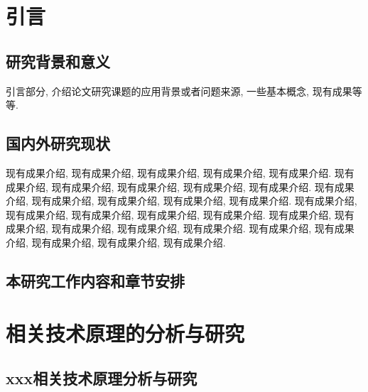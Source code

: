 \documentclass[UTF8,openright]{ctexbook}
\begin{document}
\newpage%
\pagestyle{fancy}

\listoffigures %


\newpage%
\pagestyle{fancy}
\fancyfoot[RO,RE]{{\thepage}}
\listoftables  %


\mainmatter
\linespread{1.6}\selectfont %
\pagestyle{fancy}
\fancyfoot[RO,RE]{}
\fancyfoot[LO,LE]{} %
\fancyfoot[RO,LE]{{\thepage}}%

\chapter{引言}
\section{研究背景和意义}


引言部分\cite{bi:hw-ml-challenges}, 介绍论文研究课题的应用背景或者问题来源,\cite{bi:hw-sw-co-design}
一些基本概念, 现有成果等等.


\section{国内外研究现状}


现有成果介绍, 现有成果介绍, 现有成果介绍, 现有成果介绍, 现有成果介绍.
现有成果介绍, 现有成果介绍, 现有成果介绍, 现有成果介绍, 现有成果介绍.
现有成果介绍, 现有成果介绍, 现有成果介绍, 现有成果介绍, 现有成果介绍.
现有成果介绍, 现有成果介绍, 现有成果介绍, 现有成果介绍, 现有成果介绍.
现有成果介绍, 现有成果介绍, 现有成果介绍, 现有成果介绍, 现有成果介绍.
现有成果介绍, 现有成果介绍, 现有成果介绍, 现有成果介绍, 现有成果介绍.

\section {本研究工作内容和章节安排}


\chapter {相关技术原理的分析与研究}


\section {xxx相关技术原理分析与研究}
\end{document}
